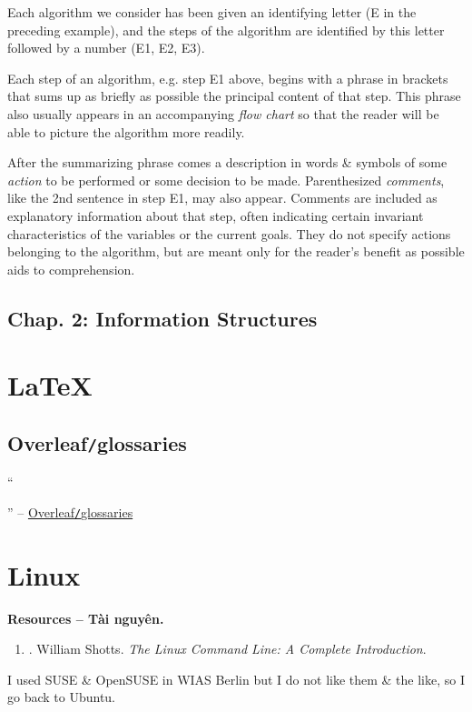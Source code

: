\documentclass{article}
\begin{document}
Each algorithm we consider has been given an identifying letter (E in the preceding example), and the steps of the algorithm are identified by this letter followed by a number (E1, E2, E3).

Each step of an algorithm, e.g. step E1 above, begins with a phrase in brackets that sums up as briefly as possible the principal content of that step. This phrase also usually appears in an accompanying {\it flow chart} so that the reader will be able to picture the algorithm more readily.

After the summarizing phrase comes a description in words \& symbols of some {\it action} to be performed or some decision to be made. Parenthesized {\it comments}, like the 2nd sentence in step E1, may also appear. Comments are included as explanatory information about that step, often indicating certain invariant characteristics of the variables or the current goals. They do not specify actions belonging to the algorithm, but are meant only for the reader's benefit as possible aids to comprehension.

\subsection{Chap. 2: Information Structures}


\section{\LaTeX}

\subsection{Overleaf{\tt/}glossaries}
``


'' -- \href{https://www.overleaf.com/learn/latex/Glossaries}{Overleaf{\tt/}glossaries}


\section{Linux}
\textbf{\textsf{Resources -- Tài nguyên.}}
\begin{enumerate}
	\item \cite{Shotts2019}. {\sc William Shotts}. {\it The Linux Command Line: A Complete Introduction}.
\end{enumerate}
I used SUSE \& OpenSUSE in WIAS Berlin but I do not like them \& the like, so I go back to Ubuntu.
\end{document}
